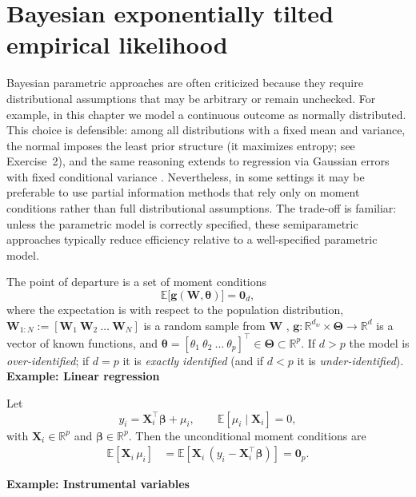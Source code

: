 \section{Bayesian exponentially tilted empirical likelihood}\label{sec12_9}

Bayesian parametric approaches are often criticized because they require distributional assumptions that may be arbitrary or remain unchecked. For example, in this chapter we model a continuous outcome as normally distributed. This choice is defensible: among all distributions with a fixed mean and variance, the normal imposes the least prior structure (it maximizes entropy; see Exercise~2), and the same reasoning extends to regression via Gaussian errors with fixed conditional variance \cite{zellner1996bmom}. Nevertheless, in some settings it may be preferable to use partial information methods that rely only on moment conditions rather than full distributional assumptions. The trade-off is familiar: unless the parametric model is correctly specified, these semiparametric approaches typically reduce efficiency relative to a well-specified parametric model.

The point of departure is a set of moment conditions
\[
\mathbb{E}\!\big[\mathbf{g}(\mathbf{W},\boldsymbol{\theta})\big]=\mathbf{0}_{d},
\]
where the expectation is with respect to the population distribution, $\mathbf{W}_{1:N}:=[\mathbf{W}_1 \ \mathbf{W}_2 \ \dots \ \mathbf{W}_N]$ is a random sample from $\mathbf{W}$ , $\mathbf{g}:\mathbb{R}^{d_w}\times\boldsymbol{\Theta}\to\mathbb{R}^{d}$ is a vector of known functions, and 
$\boldsymbol{\theta}=[\theta_{1}\ \theta_{2}\ \dots\ \theta_{p}]^{\top}\in\boldsymbol{\Theta}\subset\mathbb{R}^{p}$.
If $d>p$ the model is \emph{over-identified}; if $d=p$ it is \emph{exactly identified} (and if $d<p$ it is \emph{under-identified}).\\

\textbf{Example: Linear regression}

Let
\[
y_i=\mathbf{X}_i^{\top}\boldsymbol{\beta}+\mu_i,\qquad \mathbb{E}[\mu_i\mid \mathbf{X}_i]=0,
\]
with $\mathbf{X}_i\in\mathbb{R}^{p}$ and $\boldsymbol{\beta}\in\mathbb{R}^{p}$. Then the unconditional moment conditions are
\begin{align*}
	\mathbb{E}\!\left[\mathbf{X}_i\,\mu_i\right]
	&=\mathbb{E}\!\left[\mathbf{X}_i\,(y_i-\mathbf{X}_i^{\top}\boldsymbol{\beta})\right]
	=\mathbf{0}_{p}.
\end{align*}

\textbf{Example: Instrumental variables}

